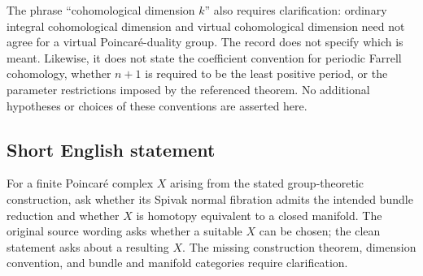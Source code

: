 \documentclass[11pt]{article}
\begin{document}
The phrase ``cohomological dimension \(k\)'' also requires clarification: ordinary integral cohomological dimension and virtual cohomological dimension need not agree for a virtual Poincar\'e-duality group. The record does not specify which is meant. Likewise, it does not state the coefficient convention for periodic Farrell cohomology, whether \(n+1\) is required to be the least positive period, or the parameter restrictions imposed by the referenced theorem. No additional hypotheses or choices of these conventions are asserted here.
\subsection{Short English statement}
For a finite Poincar\'e complex \(X\) arising from the stated group-theoretic construction, ask whether its Spivak normal fibration admits the intended bundle reduction and whether \(X\) is homotopy equivalent to a closed manifold. The original source wording asks whether a suitable \(X\) can be chosen; the clean statement asks about a resulting \(X\). The missing construction theorem, dimension convention, and bundle and manifold categories require clarification.
\end{document}

